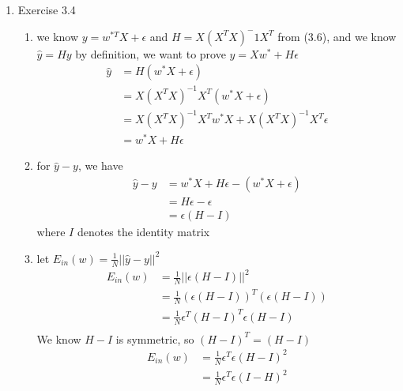 \documentclass{article}
\begin{document}
    \begin{enumerate}
        \item Exercise 3.4
        \begin{enumerate}[label=(\alph*)]
            \item we know $y = w^{*T}X + \epsilon$ and $H = X(X^TX)^-1X^T$ from (3.6), and we know $\hat{y} = Hy$ by definition, we want to prove $\hat{y} = Xw^* + H\epsilon$
            \begin{align*}
                \hat{y} &= H(w^*X + \epsilon)\\
                &= X(X^TX)^{-1}X^T(w^*X+\epsilon)\\
                &= X(X^TX)^{-1}X^Tw^*X + X(X^TX)^{-1}X^T\epsilon\\
                &= w^*X + H\epsilon
            \end{align*}

            \item for $\hat{y} - y$, we have
            \begin{align*}
                \hat{y} - y &= w^*X + H\epsilon - (w^*X + \epsilon)\\
                &= H\epsilon - \epsilon\\
                &= \epsilon(H - I)
            \end{align*}
            where $I$ denotes the identity matrix
            
            \item let $E_{in}(w) = \frac{1}{N} ||\hat{y} - y||^2$
            \begin{align*}
                E_{in}(w) &= \frac{1}{N}||\epsilon(H-I)||^2\\
                &= \frac{1}{N}(\epsilon(H - I))^T(\epsilon(H - I))\\
                &= \frac{1}{N}\epsilon^T(H-I)^T\epsilon(H-I)\\
            \end{align*}
            We know $H - I$ is symmetric, so $(H-I)^T = (H-I)$
            \begin{align*}
                E_{in}(w) &= \frac{1}{N}\epsilon^T\epsilon(H-I)^2\\
                &= \frac{1}{N}\epsilon^T\epsilon(I - H)^2
            \end{align*}


\end{enumerate}
\end{enumerate}
\end{document}
